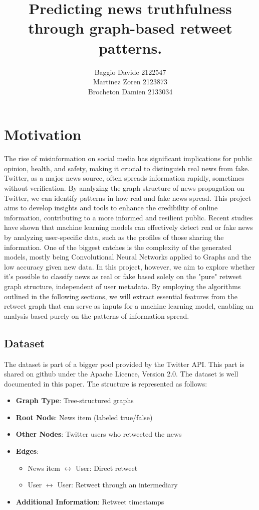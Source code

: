 \documentclass[11pt,a4paper]{article}
\title{Predicting news truthfulness through graph-based retweet patterns.}
\author{Baggio Davide 2122547 \\ Martinez Zoren 2123873 \\ Brocheton Damien 2133034}
\date{}
\begin{document}
\maketitle

\section*{Motivation}

The rise of misinformation on social media has significant implications for public opinion, health, and safety, making it crucial to distinguish real news from fake. Twitter, as a major news source, often spreads information rapidly, sometimes without verification. By analyzing the graph structure of news propagation on Twitter, we can identify patterns in how real and fake news spread. This project aims to develop insights and tools to enhance the credibility of online information, contributing to a more informed and resilient public.
Recent studies\cite{rec_studies} have shown that machine learning models can effectively detect real or fake news by analyzing user-specific data, such as the profiles of those sharing the information. One of the biggest catches is the complexity of the generated models, mostly being Convolutional Neural Networks applied to Graphs and the low accuracy given new data. In this project, however, we aim to explore whether it’s possible to classify news as real or fake based solely on the "pure" retweet graph structure, independent of user metadata. By employing the algorithms outlined in the following sections, we will extract essential features from the retweet graph that can serve as inputs for a machine learning model, enabling an analysis based purely on the patterns of information spread.

\subsection*{Dataset}

The dataset is part of a bigger pool provided by the Twitter API. This part is shared on github under the Apache Licence, Version 2.0\cite{dataset}. The dataset is well documented in this paper\cite{data_paper}.
The structure is represented as follows:
\begin{itemize}
	\setlength\itemsep{-0.3em}
	\item \textbf{Graph Type}: Tree-structured graphs
	\item \textbf{Root Node}: News item (labeled true/false)
	\item \textbf{Other Nodes}: Twitter users who retweeted the news
	\item \textbf{Edges}:
	\begin{itemize}
		\setlength\itemsep{-0.3em}
		\item News item $\leftrightarrow$ User: Direct retweet
		\item User $\leftrightarrow$ User: Retweet through an intermediary
	\end{itemize}
	\item \textbf{Additional Information}: Retweet timestamps
\end{itemize}
\end{document}
